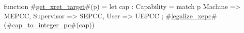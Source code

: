function #\hyperref[sailRISCVzgetzyxretzytarget]{get\_xret\_target}#(p) = {
  let cap : Capability = match p {
    Machine    => MEPCC,
    Supervisor => SEPCC,
    User       => UEPCC
  };
  #\hyperref[sailRISCVzlegalizzezyxepc]{legalize\_xepc}#(#\hyperref[sailRISCVzcapzytozyintegerzypc]{cap\_to\_integer\_pc}#(cap))
}
